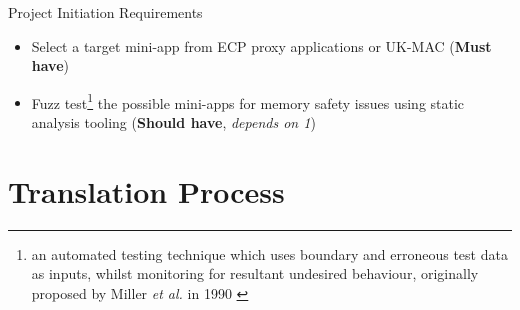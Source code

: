 \documentclass[10pt,aspectratio=169]{beamer}
\newcommand{\cmark}{\ding{51}}
\newcommand{\done}{\rlap{$\square$}{\raisebox{2pt}{\large\hspace{1pt}\textcolor{green}{\cmark}}}\hspace{-2.5pt}}
\begin{document}

\begin{frame}{Project Initiation Requirements}
    \begin{itemize}
        \item[\done\ \ 1.]
          Select a target mini-app from ECP proxy applications or UK-MAC
          (\textbf{Must have})
        \item[\done\ \ 2.]
          Fuzz test\footnote{an automated testing technique which uses boundary and erroneous test data as inputs, whilst monitoring for resultant undesired behaviour, originally proposed by Miller \textit{et al.} in 1990 \cite{millerEmpiricalStudyReliability1990}\cite{liangFuzzingStateArt2018}} the possible mini-apps for memory safety issues using static analysis tooling \cite{stepanovMemorySanitizerFastDetector2015}
          (\textbf{Should have}, \textit{depends on 1})
    \end{itemize}
\end{frame}
    






\section{Translation Process}
\end{document}
